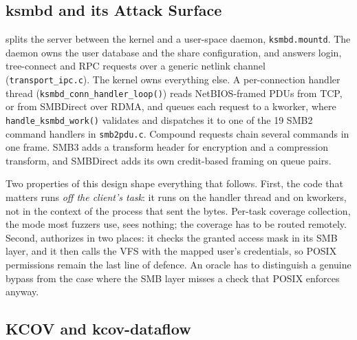 \documentclass{article}
\begin{document}
\subsection{ksmbd and its Attack Surface}

\ksmbd splits the server between the kernel and a user-space daemon,
\texttt{ksmbd.mountd}. The daemon owns the user database and the share
configuration, and answers login, tree-connect and RPC requests over a generic
netlink channel (\texttt{transport\_ipc.c}). The kernel owns everything else.
A per-connection handler thread (\texttt{ksmbd\_conn\_handler\_loop()}) reads
NetBIOS-framed PDUs from TCP, or from SMBDirect over RDMA, and queues each
request to a kworker, where \texttt{handle\_ksmbd\_work()} validates and
dispatches it to one of the 19 SMB2 command handlers in
\texttt{smb2pdu.c}. Compound requests chain several commands in one frame.
SMB3 adds a transform header for encryption and a compression transform, and
SMBDirect adds its own credit-based framing on queue pairs.

Two properties of this design shape everything that follows. First, the code
that matters runs \emph{off the client's task}: it runs on the handler thread
and on kworkers, not in the context of the process that sent the bytes.
Per-task coverage collection, the mode most fuzzers use, sees nothing; the
coverage has to be routed remotely. Second, \ksmbd authorizes in two places:
it checks the granted access mask in its SMB layer, and it then calls the VFS
with the mapped user's credentials, so POSIX permissions remain the last line
of defence. An oracle has to distinguish a genuine bypass from the case where
the SMB layer misses a check that POSIX enforces anyway.

\subsection{KCOV and kcov-dataflow}
\end{document}

